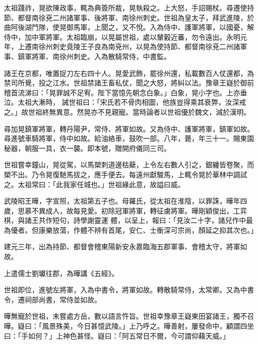 \begin{pinyinscope}
 太祖踐祚，晃欲陳政事，輒為典簽所裁，晃執殺之。上大怒，手詔賜杖。尋遷使持節、都督南徐兗二州諸軍事、後將軍、南徐州刺史。世祖為皇太子，拜武進陵，於曲阿後湖鬥隊，使晃御馬軍，上聞之，又不悅。入為侍中、護軍將軍，以國憂，解侍中，加中軍將軍。太祖臨崩，以晃屬世祖，處以輦轂近蕃，勿令遠出。永明元年，上遷南徐州刺史竟陵王子良為南兗州，以晃為使持節、都督南徐兗二州諸軍事、鎮軍將軍、南徐州刺史。入為散騎常侍，中書監。



 諸王在京都，唯置捉刀左右四十人。晃愛武飾，罷徐州還，私載數百人仗還都，為禁司所覺，投之江水。世祖禁諸王畜私仗，聞之大怒，將糾以法。豫章王嶷於御前稽首流涕曰：「晃罪誠不足宥。陛下當憶先朝念白象。」白象，晃小字也。上亦垂泣。太祖大漸時，
 誡世祖曰：「宋氏若不骨肉相圖，他族豈得乘其衰弊，汝深戒之。」故世祖終無異意。然晃亦不見親寵。當時論者以世祖優於魏文，減於漢明。



 尋加晃鎮軍將軍，轉丹陽尹，常侍、將軍如故。又為侍中、護軍將軍，鎮軍如故。尋進號車騎將軍，侍中如故。給油絡車，鼓吹一部。八年，薨，年三十一。賜東園秘器，朝服一具，衣一襲。即本號，贈開府儀同三司。



 世祖嘗幸鐘山，晃從駕，以馬槊刺道邊枯蘗，上令左右數人引之，銀纏皆卷聚，而槊不出。乃令晃復馳馬拔之，應手便去。每遠州獻駿馬，上輒令晃於華林中調試之。太祖常曰：「此我家任城也。」世祖緣此意，故謚曰威。



 武陵昭王曄，字宣照，太祖第五子也。母羅氏，從太祖在淮陰，以罪誅，曄年四歲，思慕不異成人，故每見愛。初除冠軍將軍，轉征虜將軍。曄剛穎俊出，工弈棋，與諸王共作短句，詩學謝靈運
 體，以呈上，報曰：「見汝二十字，諸兒作中最為優者。但康樂放蕩，作體不辨有首尾，安仁、士衡深可宗尚，顏延之抑其次也。」



 建元三年，出為持節、都督會稽東陽新安永嘉臨海五郡軍事、會稽太守，將軍如故。



 上遣儒士劉瓛往郡，為曄講《五經》。



 世祖即位，進號左將軍，入為中書令，將軍如故。轉散騎常侍，太常卿。又為中書令，遷祠部尚書，常侍並如故。



 曄無寵於世祖，未嘗處方岳，數以語言忤旨。世祖幸豫章王嶷東田宴諸王，獨不召曄。嶷曰：「風景殊美，今日甚憶武陵。」上乃呼之。曄善射，屢發命中，顧謂四坐曰：「手如何？」上神色甚怪。嶷曰：「阿五常日不爾，今可謂仰藉天威。」




\end{pinyinscope}
